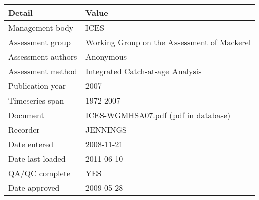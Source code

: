 \begin{table}[htb]
\centering
\begin{tabular}{lp{7cm}}
\toprule
Detail & Value \\
\midrule
Management body    & ICES                                        \\
Assessment group   & Working Group on the Assessment of Mackerel \\
Assessment authors & Anonymous                                   \\
Assessment method  & Integrated Catch-at-age Analysis            \\
Publication year   & 2007                                        \\
Timeseries span    & 1972-2007                                   \\
Document           & ICES-WGMHSA07.pdf (pdf in database)         \\
Recorder           & JENNINGS                                    \\
Date entered       & 2008-11-21                                  \\
Date last loaded   & 2011-06-10                                  \\
QA/QC complete     & YES                                         \\
Date approved      & 2009-05-28                                  \\
\bottomrule
\end{tabular}
\label{tab:assessdet}
\end{table}
